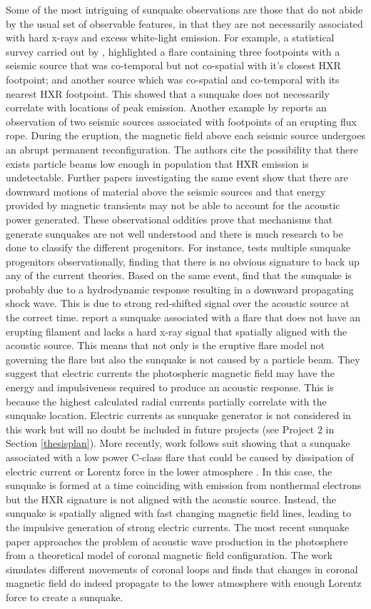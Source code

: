 Some of the most intriguing of sunquake observations are those that do not abide by the usual set of observable features, in that they are not necessarily associated with hard x-rays and excess white-light emission. For example, a statistical survey carried out by \cite{2012SoPh..277..317P}, highlighted a flare containing three footpoints with a seismic source that was co-temporal but not co-spatial with it's closest HXR footpoint; and another source which was co-spatial and co-temporal with its nearest HXR footpoint. This showed that a sunquake does not necessarily correlate with locations of peak emission. Another example by \cite{2011ApJ...741L..35Z} reports an observation of two seismic sources associated with footpoints of an erupting flux rope. During the eruption, the magnetic field above each seismic source undergoes an abrupt permanent reconfiguration. The authors cite the possibility that there exists particle beams low enough in population that HXR emission is undetectable. Further papers investigating the same event \cite{2013SoPh..284..315Z} show that there are downward motions of material above the seismic sources and that energy provided by magnetic transients may not be able to account for the acoustic power generated. These observational oddities prove that mechanisms that generate sunquakes are not well understood and there is much research to be done to classify the different progenitors. For instance, \cite{2014ApJ...796...85J} tests multiple sunquake progenitors observationally, finding that there is no obvious signature to back up any of the current theories. Based on the same event, \cite{2015ApJ...812...35M} find that the sunquake is probably due to a hydrodynamic response resulting in a downward propagating shock wave. This is due to strong red-shifted signal over the acoustic source at the correct time. \cite{2015IAUGA..2286139S} report a sunquake associated with a flare that does not have an erupting filament and lacks a hard x-ray signal that spatially aligned with the acoustic source. This means that not only is the eruptive flare model not governing the flare but also the sunquake is not caused by a particle beam. They suggest that electric currents the photospheric magnetic field may have the energy and impulsiveness required to produce an acoustic response. This is because the highest calculated radial currents partially correlate with the sunquake location. Electric currents as sunquake generator is not considered in this work but will no doubt be included in future projects (see Project 2 in Section \ref{thesisplan}). More recently, work follows suit showing that a sunquake associated with a low power C-class flare that could be caused by dissipation of electric current or Lorentz force in the lower atmosphere \citep{2015ApJ...807..102S}. In this case, the sunquake is formed at a time coinciding with emission from nonthermal electrons but the HXR signature is not aligned with the acoustic source. Instead, the sunquake is spatially aligned with fast changing magnetic field lines, leading to the impulsive generation of strong electric currents. The most recent sunquake paper \citep{2016arXiv160208245R} approaches the problem of acoustic wave production in the photosphere from a theoretical model of coronal magnetic field configuration. The work simulates different movements of coronal loops and finds that changes in coronal magnetic field do indeed propagate to the lower atmosphere with enough Lorentz force to create a sunquake.

  



